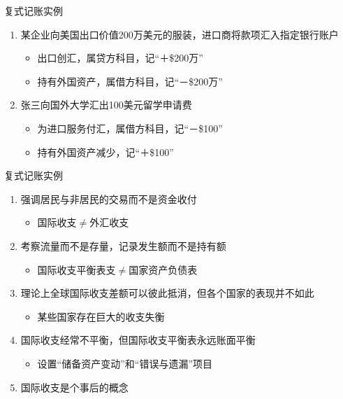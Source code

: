 \documentclass[10pt,hyperref={CJKbookmarks=true},xcolor=dvipsnames,aspectratio=169]{beamer}
\begin{document}
\begin{frame}{复式记账实例}
\begin{enumerate}
	\item 某企业向美国出口价值200万美元的服装，进口商将款项汇入指定银行账户	
	\begin{itemize}
		\item 出口创汇，属贷方科目，记“＋\$200万”
		\item 持有外国资产，属借方科目，记“－\$200万”

	\end{itemize}
	\item 张三向国外大学汇出100美元留学申请费	
	\begin{itemize}
		\item 为进口服务付汇，属借方科目，记“－\$100”		
		\item 持有外国资产减少，记“＋\$100”		
	\end{itemize}	
\end{enumerate}
\end{frame}

\begin{frame}{复式记账实例}
\begin{enumerate}
	\item 强调居民与非居民的交易而不是资金收付	
	\begin{itemize}
		\item 国际收支$\neq$外汇收支
	\end{itemize}
	\item 考察流量而不是存量，记录发生额而不是持有额
		\begin{itemize}
		\item 国际收支平衡表支$\neq$国家资产负债表				
	\end{itemize}
	\item 理论上全球国际收支差额可以彼此抵消，但各个国家的表现并不如此
\begin{itemize}
	\item 某些国家存在巨大的收支失衡		
\end{itemize}
	\item 国际收支经常不平衡，但国际收支平衡表永远账面平衡
\begin{itemize}
	\item 设置“储备资产变动”和“错误与遗漏”项目				
\end{itemize}
\item 	国际收支是个事后的概念
\end{enumerate}
\end{frame}
\end{document}
